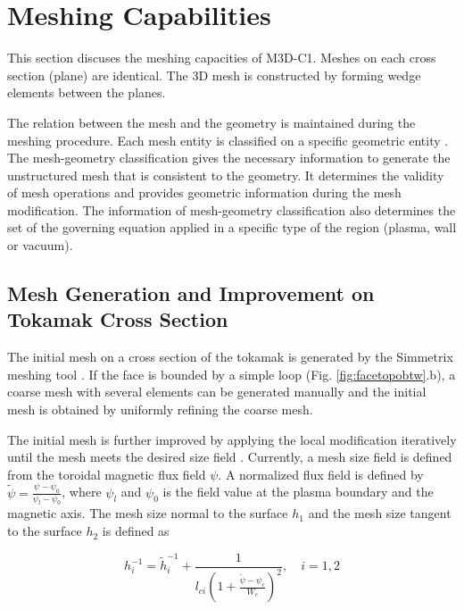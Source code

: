\documentclass[11pt]{article}  %
\begin{document}
\afterpage{\clearpage}
\section{Meshing Capabilities} \label{sec:mesh}
This section discuses the meshing capacities of M3D-C1.  Meshes on each cross section (plane) are identical. The 3D mesh is constructed by forming wedge elements between the planes.  

The relation between the mesh and the geometry is maintained during the meshing procedure. Each mesh entity is classified on a specific geometric entity \cite{shephard2000meshing,beall2004comparison,pumi-homepage}. The mesh-geometry classification gives the necessary information to generate the unstructured mesh that is consistent to the geometry. It determines the validity of mesh operations and provides geometric information during the mesh modification. The information of mesh-geometry classification also determines the set of the governing equation applied in a specific type of the region (plasma, wall or vacuum).

\subsection{Mesh Generation and Improvement on Tokamak Cross Section}
The initial mesh on a cross section of the tokamak is generated by the Simmetrix meshing tool \cite{simmetrix-web-page}. If the face is bounded by a simple loop (Fig. \ref{fig:facetopobtw}.b), a coarse mesh with several elements can be generated manually and the initial mesh is obtained by uniformly refining the coarse mesh. 

The initial mesh is further improved by applying the local modification iteratively until the mesh meets the desired size field \cite{li2003accounting,li20053d,alauzet2006parallel,sahni2007automated}. Currently, a mesh size field is defined from the toroidal magnetic flux field $\psi$. A normalized flux field is defined by $\tilde{\psi}=\frac{\psi-\psi_0}{\psi_l-\psi_0}$, where $\psi_l$ and $\psi_0$ is the field value at the plasma boundary and the magnetic axis. The mesh size normal to the surface $h_1$ and the mesh size tangent to the surface $h_2$ is defined as

\begin{equation}
h_i^{-1}=\tilde{h}_i^{-1}+\frac{1}{l_{ci}\left(1+\frac{\tilde{\psi}-\psi_c}{W_c}\right)^2}, \quad i=1,2
\end{equation}
\end{document}
